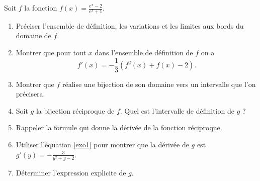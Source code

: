 
\begin{exercice}\label{exosession1-0001}

Soit $f$ la fonction $\displaystyle f(x) = \frac{e^x - 2}{e^x+1}$. 
\begin{enumerate}
\item Préciser l'ensemble de définition, les variations et les limites aux bords du domaine de $f$.
\item Montrer que pour tout $x$ dans l'ensemble de définition de $f$ on a 
  \begin{equation} \label{exo1}
    f'(x) = -\frac{1}{3}\left(f^2(x) + f(x)-2\right).
  \end{equation}
\item Montrer que $f$ réalise une bijection de son domaine vers un intervalle que l'on précisera.
\item Soit $g$ la bijection réciproque de $f$. Quel est l'intervalle de définition de $g$ ? 
\item Rappeler la formule qui donne la dérivée de la fonction réciproque.
\item Utiliser l'équation \eqref{exo1} pour montrer que la dérivée de $g$ est $g'(y)=-\frac{3}{y^2+y-2}$.
\item Déterminer l'expression explicite de $g$. 
\end{enumerate}

\end{exercice}

